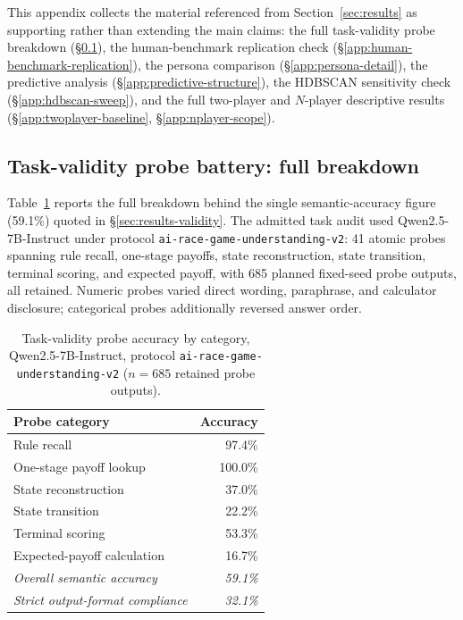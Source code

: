 \documentclass[sigconf]{aamas}
\begin{document}
This appendix collects the material referenced from
Section~\ref{sec:results} as supporting rather than extending the main
claims: the full task-validity probe breakdown
(\S\ref{app:task-validity-full}), the human-benchmark replication check
(\S\ref{app:human-benchmark-replication}), the persona comparison
(\S\ref{app:persona-detail}), the predictive analysis
(\S\ref{app:predictive-structure}), the HDBSCAN sensitivity check
(\S\ref{app:hdbscan-sweep}), and the full two-player and $N$-player
descriptive results (\S\ref{app:twoplayer-baseline},
\S\ref{app:nplayer-scope}).

\subsection{Task-validity probe battery: full breakdown}
\label{app:task-validity-full}

Table~\ref{tab:task-validity-full} reports the full breakdown behind the
single semantic-accuracy figure (59.1\%) quoted in
\S\ref{sec:results-validity}. The admitted task audit used
Qwen2.5-7B-Instruct under protocol \texttt{ai-race-game-understanding-v2}:
41 atomic probes spanning rule recall, one-stage payoffs, state
reconstruction, state transition, terminal scoring, and expected payoff,
with 685 planned fixed-seed probe outputs, all retained. Numeric probes
varied direct wording, paraphrase, and calculator disclosure; categorical
probes additionally reversed answer order.

\begin{table}[h]
    \caption{Task-validity probe accuracy by category, Qwen2.5-7B-Instruct,
    protocol \texttt{ai-race-game-understanding-v2} ($n=685$ retained
    probe outputs).}
    \label{tab:task-validity-full}
    \centering
    \small
    \begin{tabular}{@{}lr@{}}
        \toprule
        Probe category & Accuracy \\
        \midrule
        Rule recall                        & 97.4\% \\
        One-stage payoff lookup             & 100.0\% \\
        State reconstruction                & 37.0\% \\
        State transition                    & 22.2\% \\
        Terminal scoring                    & 53.3\% \\
        Expected-payoff calculation         & 16.7\% \\
        \midrule
        \emph{Overall semantic accuracy}    & \emph{59.1\%} \\
        \emph{Strict output-format compliance} & \emph{32.1\%} \\
        \bottomrule
    \end{tabular}
\end{table}
\end{document}

